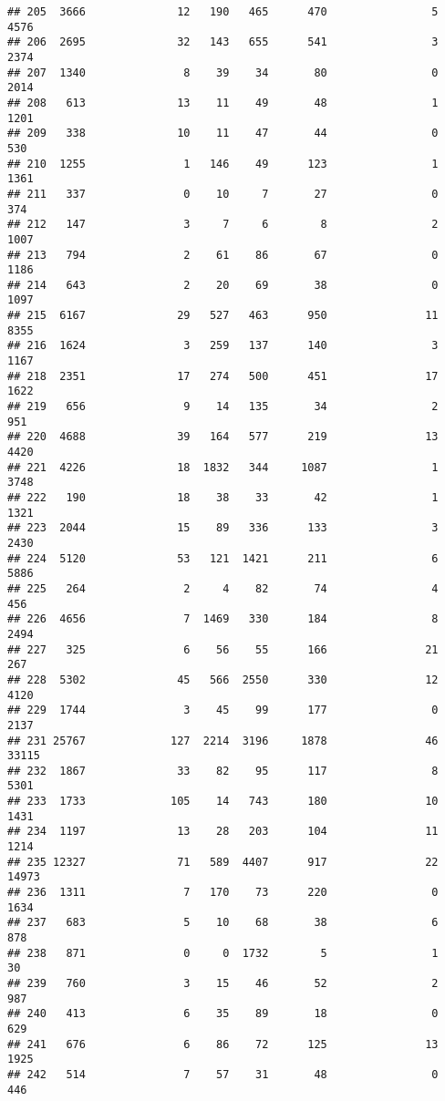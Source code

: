 \documentclass[
]{article}
\begin{document}
\begin{verbatim}
## 205  3666              12   190   465      470                5  4576
## 206  2695              32   143   655      541                3  2374
## 207  1340               8    39    34       80                0  2014
## 208   613              13    11    49       48                1  1201
## 209   338              10    11    47       44                0   530
## 210  1255               1   146    49      123                1  1361
## 211   337               0    10     7       27                0   374
## 212   147               3     7     6        8                2  1007
## 213   794               2    61    86       67                0  1186
## 214   643               2    20    69       38                0  1097
## 215  6167              29   527   463      950               11  8355
## 216  1624               3   259   137      140                3  1167
## 218  2351              17   274   500      451               17  1622
## 219   656               9    14   135       34                2   951
## 220  4688              39   164   577      219               13  4420
## 221  4226              18  1832   344     1087                1  3748
## 222   190              18    38    33       42                1  1321
## 223  2044              15    89   336      133                3  2430
## 224  5120              53   121  1421      211                6  5886
## 225   264               2     4    82       74                4   456
## 226  4656               7  1469   330      184                8  2494
## 227   325               6    56    55      166               21   267
## 228  5302              45   566  2550      330               12  4120
## 229  1744               3    45    99      177                0  2137
## 231 25767             127  2214  3196     1878               46 33115
## 232  1867              33    82    95      117                8  5301
## 233  1733             105    14   743      180               10  1431
## 234  1197              13    28   203      104               11  1214
## 235 12327              71   589  4407      917               22 14973
## 236  1311               7   170    73      220                0  1634
## 237   683               5    10    68       38                6   878
## 238   871               0     0  1732        5                1    30
## 239   760               3    15    46       52                2   987
## 240   413               6    35    89       18                0   629
## 241   676               6    86    72      125               13  1925
## 242   514               7    57    31       48                0   446

\end{verbatim}
\end{document}
